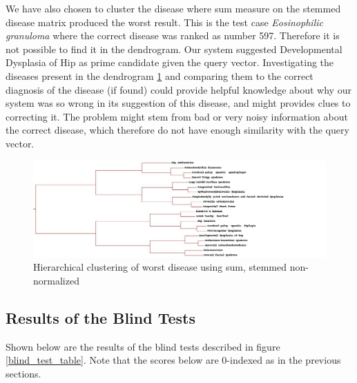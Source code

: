 We have also chosen to cluster the disease where sum measure on the
stemmed disease matrix produced the worst result. This is the test
case \textit{Eosinophilic granuloma} where the correct disease was
ranked as number 597. Therefore it is not possible to find it in the
dendrogram. Our system suggested Developmental Dysplasia of Hip as
prime candidate given the query vector. Investigating the diseases
present in the dendrogram
\ref{sum_stem_top20_worst_developmental_dysplasia_of_hip} and
comparing them to the correct diagnosis of the disease (if found)
could provide helpful knowledge about why our system was so wrong in
its suggestion of this disease, and might provides clues to correcting
it. The problem might stem from bad or very noisy information about
the correct disease, which therefore do not have enough similarity
with the query vector.

\begin{figure}[H]
  \begin{center}
    \includegraphics[width=1.3\textwidth]{clusters/sum_stem_top20_worst_developmental_dysplasia_of_hip.jpg}
  \end{center}
  \caption{Hierarchical clustering of worst disease using sum, stemmed non-normalized}
  \label{sum_stem_top20_worst_developmental_dysplasia_of_hip}
\end{figure}

\subsection{Results of the Blind Tests\label{Blindtest}}

Shown below are the results of the blind tests described in figure \ref{blind_test_table}.
Note that the scores below are 0-indexed as in the previous sections.

